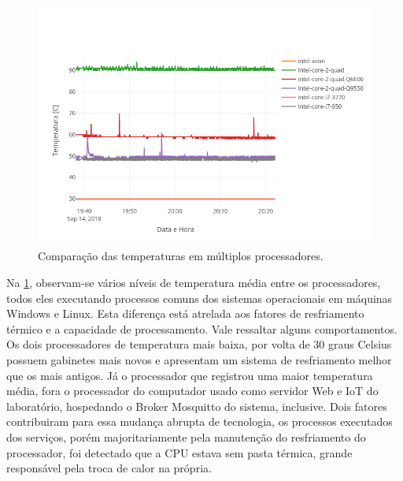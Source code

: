 \begin{figure}[h!]
\centering
\includegraphics[width=16cm]{./02_Capitulos/02_Cap4/figures/temp-devices-5}
\caption{Comparação das temperaturas em múltiplos processadores.}
\label{fig:temp-devices-5}
\end{figure}

Na \ref{fig:temp-devices-5}, observam-se vários níveis de temperatura média entre os processadores, todos eles executando processos comuns dos sistemas operacionais em máquinas Windows e Linux. Esta diferença está atrelada aos fatores de resfriamento térmico e a capacidade de processamento. Vale ressaltar alguns comportamentos. Os dois processadores de temperatura mais baixa, por volta de 30 graus Celsius possuem gabinetes mais novos e apresentam um sistema de resfriamento melhor que os mais antigos. Já o processador que registrou uma maior temperatura média, fora o processador do computador usado como servidor Web e IoT do laboratório, hospedando o Broker Mosquitto do sistema, inclusive. Dois fatores contribuiram para essa mudança abrupta de tecnologia, os processos executados dos serviços, porém majoritariamente pela manutenção do resfriamento do processador, foi detectado que a CPU estava sem pasta térmica, grande responsável pela troca de calor na própria.


